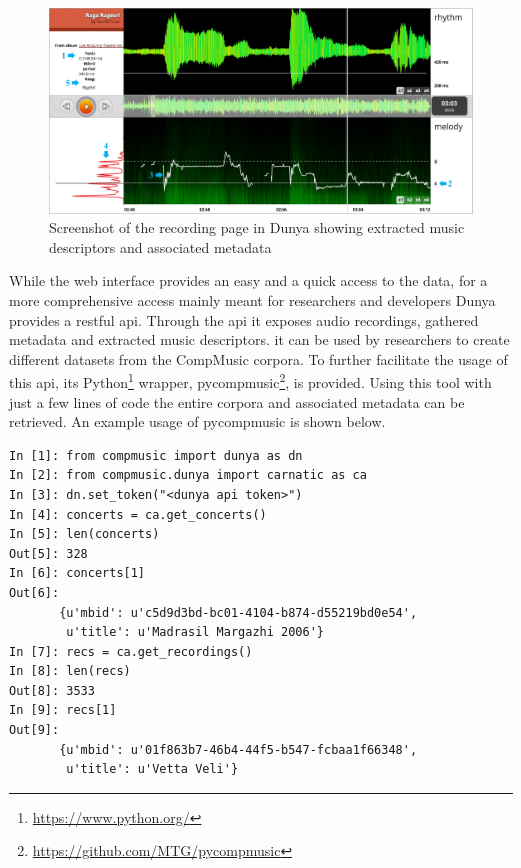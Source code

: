 \begin{figure}
	\begin{center}
		\includegraphics[width=\figSizeHundred]{ch08_applications/figures/dunyaScreenshot.pdf}
		\end{center}
		\caption[Screenshot of the recording page in Dunya]{Screenshot of the recording page in Dunya showing extracted music descriptors and associated metadata}
		\label{fig:dunya_recording}
\end{figure}

While the web interface provides an easy and a quick access to the data, for a more comprehensive access mainly meant for researchers and developers Dunya provides a restful \gls{api}. Through the \gls{api} it exposes audio recordings, gathered metadata and extracted music descriptors. it can be used by researchers to create different datasets from the CompMusic corpora. To further facilitate the usage of this \gls{api}, its Python\footnote{\url{https://www.python.org/}} wrapper, \gls{pycompmusic}\footnote{\url{https://github.com/MTG/pycompmusic}}, is provided. Using this tool with just a few lines of code the entire corpora and associated metadata can be retrieved. An example usage of \gls{pycompmusic} is shown below.

%
%
%
%
%
{
	\small
\begin{verbatim}
In [1]: from compmusic import dunya as dn
In [2]: from compmusic.dunya import carnatic as ca
In [3]: dn.set_token("<dunya api token>")
In [4]: concerts = ca.get_concerts()
In [5]: len(concerts)
Out[5]: 328
In [6]: concerts[1]
Out[6]: 
       {u'mbid': u'c5d9d3bd-bc01-4104-b874-d55219bd0e54',
        u'title': u'Madrasil Margazhi 2006'}
In [7]: recs = ca.get_recordings()
In [8]: len(recs)
Out[8]: 3533
In [9]: recs[1]
Out[9]: 
       {u'mbid': u'01f863b7-46b4-44f5-b547-fcbaa1f66348',
        u'title': u'Vetta Veli'}        
\end{verbatim}
}

